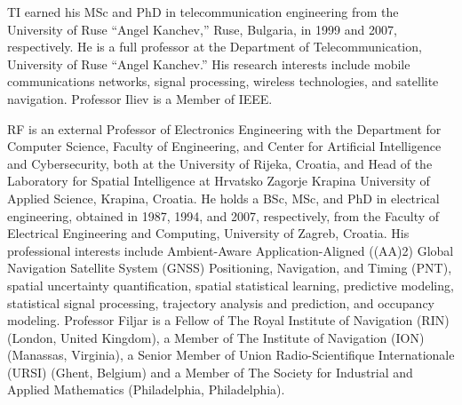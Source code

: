 \let\LaTeXcline\cline\documentclass[sn-mathphys-num]{sn-jnl}\let\cline\LaTeXcline
\begin{document}
TI earned his MSc and PhD in telecommunication engineering from the University of Ruse “Angel Kanchev,” Ruse, Bulgaria, in 1999 and 2007, respectively. He is a full professor at the Department of Telecommunication, University of Ruse “Angel Kanchev.” His research interests include mobile communications networks, signal processing, wireless technologies, and satellite navigation. Professor Iliev is a Member of IEEE.

RF is an external Professor of Electronics Engineering with the Department for Computer Science, Faculty of Engineering, and Center for Artificial Intelligence and Cybersecurity, both at the University of Rijeka, Croatia, and Head of the Laboratory for Spatial Intelligence at Hrvatsko Zagorje Krapina University of Applied Science, Krapina, Croatia. He holds a BSc, MSc, and PhD in electrical engineering, obtained in 1987, 1994, and 2007, respectively, from the Faculty of Electrical Engineering and Computing, University of Zagreb, Croatia. His professional interests include Ambient-Aware Application-Aligned ((AA)2) Global Navigation Satellite System (GNSS) Positioning, Navigation, and Timing (PNT), spatial uncertainty quantification, spatial statistical learning, predictive modeling, statistical signal processing, trajectory analysis and prediction, and occupancy modeling. Professor Filjar is a Fellow of The Royal Institute of Navigation (RIN) (London, United Kingdom), a Member of The Institute of Navigation (ION) (Manassas, Virginia), a Senior Member of Union Radio-Scientifique Internationale (URSI) (Ghent, Belgium) and a Member of The Society for Industrial and Applied Mathematics  (Philadelphia, Philadelphia).


\end{document}
